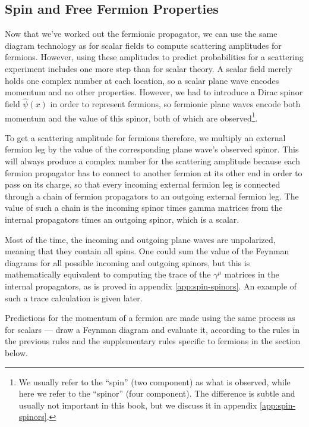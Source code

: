 
\subsection{Spin and Free Fermion Properties}
Now that we've worked out the fermionic propagator, we can use the same diagram technology as for scalar fields to compute scattering amplitudes for fermions. However, using these amplitudes to predict probabilities for a scattering experiment includes one more step than for scalar theory. A scalar field merely holds one complex number at each location, so a scalar plane wave encodes momentum and no other properties. However, we had to introduce a Dirac spinor field $\hat \psi(x)$ in order to represent fermions, so fermionic plane waves encode both momentum and the value of this spinor, both of which are observed\footnote{We usually refer to the ``spin'' (two component) as what is observed, while here we refer to the ``spinor'' (four component). The difference is subtle and usually not important in this book, but we discuss it in appendix \ref{app:spin-spinors}.}.

To get a scattering amplitude for fermions therefore, we multiply an external fermion leg by the value of the corresponding plane wave's observed spinor. This will always produce a complex number for the scattering amplitude because each fermion propagator has to connect to another fermion at its other end in order to pass on its charge, so that every incoming external fermion leg is connected through a chain of fermion propagators to an outgoing external fermion leg. The value of such a chain is the incoming spinor times gamma matrices from the internal propagators times an outgoing spinor, which is a scalar.

Most of the time, the incoming and outgoing plane waves are unpolarized, meaning that they contain all spins. One could sum the value of the Feynman diagrams for all possible incoming and outgoing spinors, but this is mathematically equivalent to computing the trace of the $\gamma^\mu$ matrices in the internal propagators, as is proved in appendix \ref{app:spin-spinors}. An example of such a trace calculation is given later.

Predictions for the momentum of a fermion are made using the same process as for scalars --- draw a Feynman diagram and evaluate it, according to the rules in the previous rules and the supplementary rules specific to fermions in the section below.


